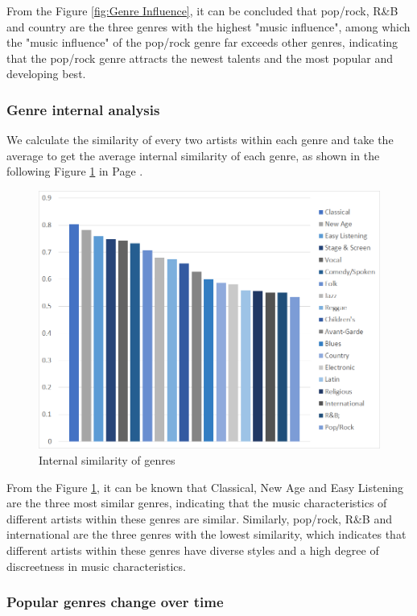 \documentclass[12pt]{article}  %
\begin{document}
From the Figure \ref{fig:Genre Influence}, it can be concluded that pop/rock, R\&B and country are the three genres with the highest "music influence", among which the "music influence" of the pop/rock genre far exceeds other genres, indicating that the pop/rock genre attracts the newest talents and the most popular and developing best. 


\subsubsection{Genre internal analysis }

We calculate the similarity of every two artists within each genre and take the average to get the average internal similarity of each genre, as shown in the following Figure \ref{fig:Internal similarity table of genres} in Page  \pageref{fig:Internal similarity table of genres}.

\begin{figure}[htbp]
\centering
\includegraphics[width=.7\textwidth]{img/Genre Similarity.jpg}
\caption{Internal similarity of genres}\label{fig:Internal similarity table of genres}
\end{figure}

From the Figure \ref{fig:Internal similarity table of genres}, it can be known that Classical, New Age and Easy Listening are the three most similar genres, indicating that the music characteristics of different artists within these genres are similar. Similarly, pop/rock, R\&B and international are the three genres with the lowest similarity, which indicates that different artists within these genres have diverse styles and a high degree of discreetness in music characteristics. 


\subsubsection{Popular genres change over time }
\end{document}
